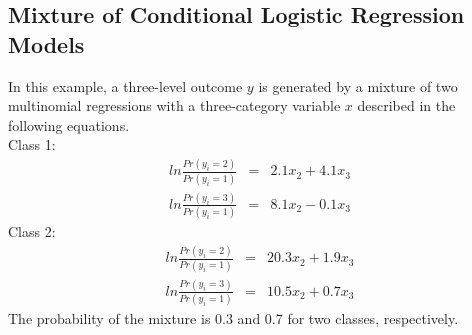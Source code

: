 \documentclass[nojss]{jss}
\begin{document}
   \subsection{Mixture of Conditional Logistic Regression Models}
   In this example, a three-level outcome $y$ is generated by a mixture of two multinomial regressions with a three-category variable $x$ described in the following equations. \\
   Class 1: \\
   \begin{eqnarray}
   ln \frac{Pr(y_i = 2)}{Pr(y_i = 1)} &=& 2.1 x_2 + 4.1 x_3 \\
   ln \frac{Pr(y_i = 3)}{Pr(y_i = 1)} &=& 8.1 x_2 - 0.1 x_3
   \end{eqnarray}
   Class 2: \\
   \begin{eqnarray}
   ln \frac{Pr(y_i = 2)}{Pr(y_i = 1)} &=& 20.3 x_2 + 1.9 x_3 \\
   ln \frac{Pr(y_i = 3)}{Pr(y_i = 1)} &=& 10.5 x_2 + 0.7 x_3
   \end{eqnarray}   
   The probability of the mixture is 0.3 and 0.7 for two classes, respectively.
\end{document}
